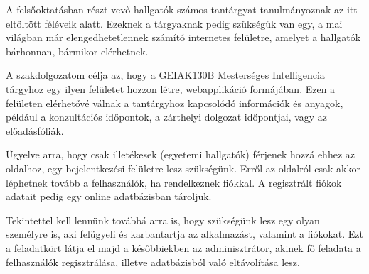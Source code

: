 
A felsőoktatásban részt vevő hallgatók számos tantárgyat tanulmányoznak az itt eltöltött féléveik alatt. Ezeknek a tárgyaknak pedig szükségük van egy, a mai világban már elengedhetetlennek számító internetes felületre, amelyet a hallgatók bárhonnan, bármikor elérhetnek.

A szakdolgozatom célja az, hogy a GEIAK130B Mesterséges Intelligencia tárgyhoz egy ilyen felületet hozzon létre, webapplikáció formájában. Ezen a felületen elérhetővé válnak a tantárgyhoz kapcsolódó információk és anyagok, például a konzultációs időpontok, a zárthelyi dolgozat időpontjai, vagy az előadásfóliák.

Ügyelve arra, hogy csak illetékesek (egyetemi hallgatók) férjenek hozzá ehhez az oldalhoz, egy bejelentkezési felületre lesz szükségünk. Erről az oldalról csak akkor léphetnek tovább a felhasználók, ha rendelkeznek fiókkal. A regisztrált fiókok adatait pedig egy online adatbázisban tároljuk.

Tekintettel kell lennünk továbbá arra is, hogy szükségünk lesz egy olyan személyre is, aki felügyeli és karbantartja az alkalmazást, valamint a fiókokat. Ezt a feladatkört látja el majd a későbbiekben az adminisztrátor, akinek fő feladata a felhasználók regisztrálása, illetve adatbázisból való eltávolítása lesz.
